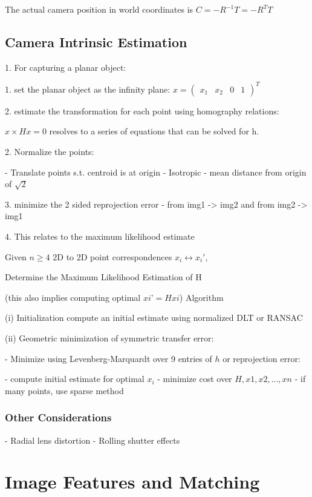 The actual camera position in world coordinates is $C = -R^{-1}T=-R^{T}T $

\subsection{Camera Intrinsic Estimation}
1. For capturing a planar object:

   1. set the planar object as the infinity plane: $x = ( \begin{matrix} x_1 & x_2 & 0 & 1 \end{matrix})^T$

   2. estimate the transformation for each point using homography relations:

      $ x \times H x = 0$ resolves to a series of equations that can be solved for h.

2. Normalize the points:

   - Translate points s.t. centroid is at origin
   - Isotropic - mean distance from origin of $\sqrt 2 $

3. minimize the 2 sided reprojection error - from img1 -> img2 and from img2 -> img1

4. This relates to the maximum likelihood estimate

 Given $n\ge 4$ 2D to 2D point correspondences {$x_i\leftrightarrow x_i\prime$},

Determine the Maximum Likelihood Estimation of H

(this also implies computing optimal $xi’=Hxi$) Algorithm

(i) Initialization compute an initial estimate using normalized DLT or RANSAC

(ii) Geometric minimization of symmetric transfer error: 

- Minimize using Levenberg-Marquardt over 9 entries of $h$ or reprojection error:

- compute initial estimate for optimal $x_i$
- minimize cost over ${H,x1,x2,...,xn}$
- if many points, use sparse method

\subsubsection{Other Considerations}

- Radial lens distortion
- Rolling shutter effects

\section{Image Features and Matching}

